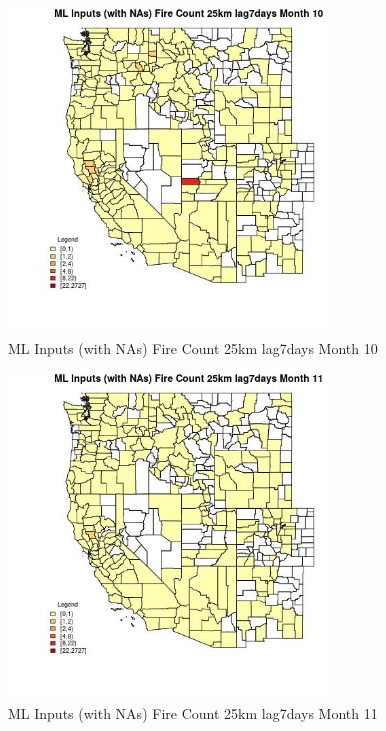 \begin{figure} 
\centering  
\includegraphics[width=0.77\textwidth]{Code_Outputs/Report_ML_input_PM25_Step4_part_f_de_duplicated_aves_prioritize_24hr_obswNAs_CountyFire_Count_25km_lag7daysmedianMonth10.jpg} 
\caption{\label{fig:Report_ML_input_PM25_Step4_part_f_de_duplicated_aves_prioritize_24hr_obswNAsCountyFire_Count_25km_lag7daysmedianMonth10}ML Inputs (with NAs) Fire Count 25km lag7days Month 10} 
\end{figure} 
 

\begin{figure} 
\centering  
\includegraphics[width=0.77\textwidth]{Code_Outputs/Report_ML_input_PM25_Step4_part_f_de_duplicated_aves_prioritize_24hr_obswNAs_CountyFire_Count_25km_lag7daysmedianMonth11.jpg} 
\caption{\label{fig:Report_ML_input_PM25_Step4_part_f_de_duplicated_aves_prioritize_24hr_obswNAsCountyFire_Count_25km_lag7daysmedianMonth11}ML Inputs (with NAs) Fire Count 25km lag7days Month 11} 
\end{figure} 
 

